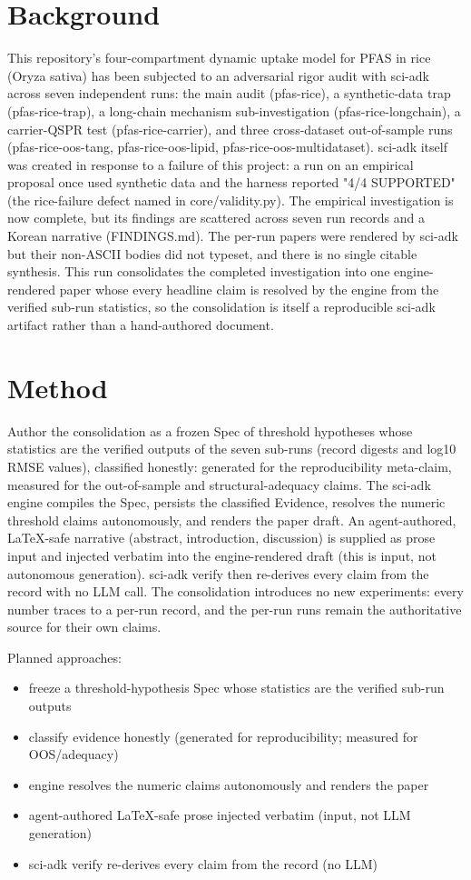 \documentclass{article}
\begin{document}
\section{Background}
This repository's four-compartment dynamic uptake model for PFAS in rice
(Oryza sativa) has been subjected to an adversarial rigor audit with
sci-adk across seven independent runs: the main audit (pfas-rice), a
synthetic-data trap (pfas-rice-trap), a long-chain mechanism
sub-investigation (pfas-rice-longchain), a carrier-QSPR test
(pfas-rice-carrier), and three cross-dataset out-of-sample runs
(pfas-rice-oos-tang, pfas-rice-oos-lipid, pfas-rice-oos-multidataset).
sci-adk itself was created in response to a failure of this project: a
run on an empirical proposal once used synthetic data and the harness
reported "4/4 SUPPORTED" (the rice-failure defect named in
core/validity.py). The empirical investigation is now complete, but its
findings are scattered across seven run records and a Korean narrative
(FINDINGS.md). The per-run papers were rendered by sci-adk but their
non-ASCII bodies did not typeset, and there is no single citable
synthesis. This run consolidates the completed investigation into one
engine-rendered paper whose every headline claim is resolved by the
engine from the verified sub-run statistics, so the consolidation is
itself a reproducible sci-adk artifact rather than a hand-authored
document.

\section{Method}
Author the consolidation as a frozen Spec of threshold hypotheses whose
statistics are the verified outputs of the seven sub-runs (record
digests and log10 RMSE values), classified honestly: generated for the
reproducibility meta-claim, measured for the out-of-sample and
structural-adequacy claims. The sci-adk engine compiles the Spec,
persists the classified Evidence, resolves the numeric threshold claims
autonomously, and renders the paper draft. An agent-authored,
LaTeX-safe narrative (abstract, introduction, discussion) is supplied as
prose input and injected verbatim into the engine-rendered draft (this
is input, not autonomous generation). sci-adk verify then re-derives
every claim from the record with no LLM call. The consolidation
introduces no new experiments: every number traces to a per-run record,
and the per-run runs remain the authoritative source for their own
claims.

Planned approaches:
\begin{itemize}
  \item freeze a threshold-hypothesis Spec whose statistics are the verified sub-run outputs
  \item classify evidence honestly (generated for reproducibility; measured for OOS/adequacy)
  \item engine resolves the numeric claims autonomously and renders the paper
  \item agent-authored LaTeX-safe prose injected verbatim (input, not LLM generation)
  \item sci-adk verify re-derives every claim from the record (no LLM)
\end{itemize}
\end{document}
